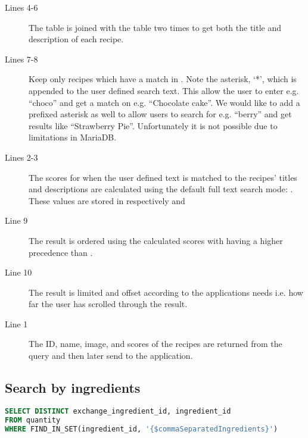 \begin{description}
\item[Lines 4-6] The  table is joined with the  table two times to get both the title and description of each recipe.
\item[Lines 7-8] Keep only recipes which have a match in . Note the asterisk, `*', which is appended to the user defined search text. This allow the user to enter e.g. ``choco'' and get a match on e.g. ``Chocolate cake''. We would like to add a prefixed asterisk as well to allow users to search for e.g. ``berry'' and get results like ``Strawberry Pie''. Unfortunately it is not possible due to limitations in MariaDB.
\item[Lines 2-3] The scores for when the user defined text is matched to the recipes' titles and descriptions are calculated using the default full text search mode: . These values are stored in respectively  and 
\item[Line 9] The result is ordered using the calculated scores with  having a higher precedence than .
\item[Line 10] The result is limited and offset according to the applications needs i.e. how far the user has scrolled through the result.
\item[Line 1] The ID, name, image, and scores of the recipes are returned from the query and then later send to the application.
\end{description}



\subsection*{Search by ingredients}

\begin{lstlisting}[language=SQL, float=h, label={}, caption={\$quantityQuery, get matching quantities.}]
SELECT DISTINCT exchange_ingredient_id, ingredient_id
FROM quantity
WHERE FIND_IN_SET(ingredient_id, '{$commaSeparatedIngredients}')
\end{lstlisting}

